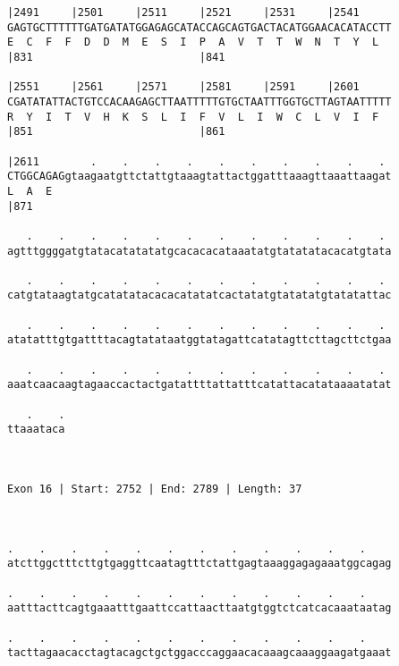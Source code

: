 \documentclass{article}
\begin{document}
\begin{Verbatim}
|2491     |2501     |2511     |2521     |2531     |2541     
GAGTGCTTTTTTGATGATATGGAGAGCATACCAGCAGTGACTACATGGAACACATACCTT
E  C  F  F  D  D  M  E  S  I  P  A  V  T  T  W  N  T  Y  L  
|831                          |841                          
  
|2551     |2561     |2571     |2581     |2591     |2601     
CGATATATTACTGTCCACAAGAGCTTAATTTTTGTGCTAATTTGGTGCTTAGTAATTTTT
R  Y  I  T  V  H  K  S  L  I  F  V  L  I  W  C  L  V  I  F  
|851                          |861                          
  
|2611        .    .    .    .    .    .    .    .    .    . 
CTGGCAGAGgtaagaatgttctattgtaaagtattactggatttaaagttaaattaagat
L  A  E                                                     
|871                                                        
  
   .    .    .    .    .    .    .    .    .    .    .    . 
agtttggggatgtatacatatatatgcacacacataaatatgtatatatacacatgtata
                                                            
   .    .    .    .    .    .    .    .    .    .    .    . 
catgtataagtatgcatatatacacacatatatcactatatgtatatatgtatatattac
                                                            
   .    .    .    .    .    .    .    .    .    .    .    . 
atatatttgtgattttacagtatataatggtatagattcatatagttcttagcttctgaa
                                                            
   .    .    .    .    .    .    .    .    .    .    .    . 
aaatcaacaagtagaaccactactgatattttattatttcatattacatataaaatatat
                                                            
   .    .
ttaaataca
         
         
 
Exon 16 | Start: 2752 | End: 2789 | Length: 37



.    .    .    .    .    .    .    .    .    .    .    .    
atcttggctttcttgtgaggttcaatagtttctattgagtaaaggagagaaatggcagag
                                                            
.    .    .    .    .    .    .    .    .    .    .    .    
aatttacttcagtgaaatttgaattccattaacttaatgtggtctcatcacaaataatag
                                                            
.    .    .    .    .    .    .    .    .    .    .    .    
tacttagaacacctagtacagctgctggacccaggaacacaaagcaaaggaagatgaaat
                                                            

\end{Verbatim}
\end{document}
